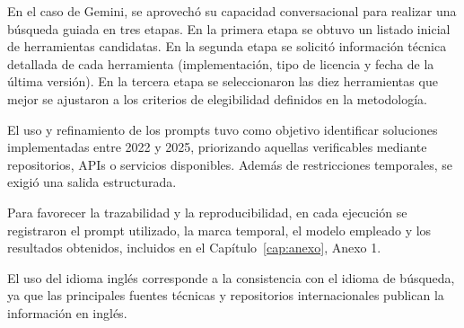 En el caso de Gemini, se aprovechó su capacidad conversacional para realizar una búsqueda guiada en tres etapas. En la primera etapa se obtuvo un listado inicial de herramientas candidatas. En la segunda etapa se solicitó información técnica detallada de cada herramienta (implementación, tipo de licencia y fecha de la última versión). En la tercera etapa se seleccionaron las diez herramientas que mejor se ajustaron a los criterios de elegibilidad definidos en la metodología.

El uso y refinamiento de los prompts tuvo como objetivo identificar soluciones implementadas entre 2022 y 2025, priorizando aquellas verificables mediante repositorios, APIs o servicios disponibles. Además de restricciones temporales, se exigió una salida estructurada.

Para favorecer la trazabilidad y la reproducibilidad, en cada ejecución se registraron el prompt utilizado, la marca temporal, el modelo empleado y los resultados obtenidos, incluidos en el Capítulo~\ref{cap:anexo}, Anexo 1.

El uso del idioma inglés corresponde a la consistencia con el idioma de búsqueda, ya que las principales fuentes técnicas y repositorios internacionales publican la información en inglés. 
